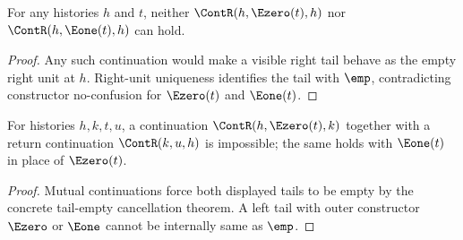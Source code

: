 \begin{theorem}
\label{thm:cont-self-extension-tail-absurd}
For any histories $h$ and $t$, neither $\ContR(h,\Ezero(t),h)$ nor
$\ContR(h,\Eone(t),h)$ can hold.
\end{theorem}
\begin{proof}
Any such continuation would make a visible right tail behave as the empty
right unit at $h$. Right-unit uniqueness identifies the tail with $\emp$,
contradicting constructor no-confusion for $\Ezero(t)$ and $\Eone(t)$.
\end{proof}

\begin{theorem}
\label{thm:cont-mutual-extension-left-tail-absurd}
For histories $h,k,t,u$, a continuation $\ContR(h,\Ezero(t),k)$ together
with a return continuation $\ContR(k,u,h)$ is impossible; the same holds with
$\Eone(t)$ in place of $\Ezero(t)$.
\end{theorem}
\begin{proof}
Mutual continuations force both displayed tails to be empty by the concrete
tail-empty cancellation theorem. A left tail with outer constructor
$\Ezero$ or $\Eone$ cannot be internally same as $\emp$.
\end{proof}


